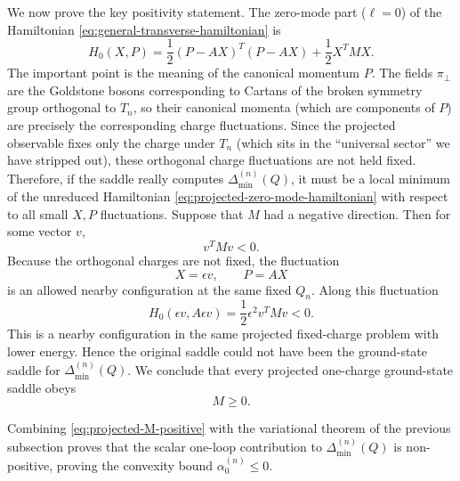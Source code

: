 \documentclass[a4paper,11pt]{article}
\begin{document}
We now prove the key positivity statement. The zero-mode part ($\ell=0$) of the Hamiltonian \eqref{eq:general-transverse-hamiltonian} is
\begin{equation}\label{eq:projected-zero-mode-hamiltonian}
  H_0(X,P) = \frac12(P-AX)^T(P-AX) + \frac12 X^TMX .
\end{equation}
The important point is the meaning of the canonical momentum $P$. The fields $\pi_\perp$ are the Goldstone bosons corresponding to Cartans of the broken symmetry group orthogonal to $T_n$, so their canonical momenta (which are components of $P$) are precisely the corresponding charge fluctuations. Since the projected observable fixes only the charge under $T_n$ (which sits in the ``universal sector'' we have stripped out), these orthogonal charge fluctuations are not held fixed. Therefore, if the saddle really computes $\Delta_{\min}^{(n)}(Q)$, it must be a local minimum of the unreduced Hamiltonian \eqref{eq:projected-zero-mode-hamiltonian} with respect to all small $X,P$ fluctuations. Suppose that $M$ had a negative direction. Then for some vector $v$,
\begin{equation}
  v^TMv<0 .
\end{equation}
Because the orthogonal charges are not fixed, the fluctuation
\begin{equation}\label{eq:projected-instability-fluctuation}
  X=\epsilon v, \qquad P=AX
\end{equation}
is an allowed nearby configuration at the same fixed $Q_n$. Along this
fluctuation
\begin{equation}
  H_0(\epsilon v,A\epsilon v) = \frac12\epsilon^2 v^TMv <0 .
\end{equation}
This is a nearby configuration in the same projected fixed-charge problem with lower energy. Hence the original saddle could not have been the ground-state saddle for $\Delta_{\min}^{(n)}(Q)$. We conclude that every projected one-charge ground-state saddle obeys
\begin{equation}\label{eq:projected-M-positive}
  M\geq0 .
\end{equation}

Combining \eqref{eq:projected-M-positive} with the variational theorem of the previous subsection proves that the scalar one-loop contribution to $\Delta_{\min}^{(n)}(Q)$ is non-positive, proving the convexity bound $\alpha_0^{(n)}\leq 0$.
\end{document}
